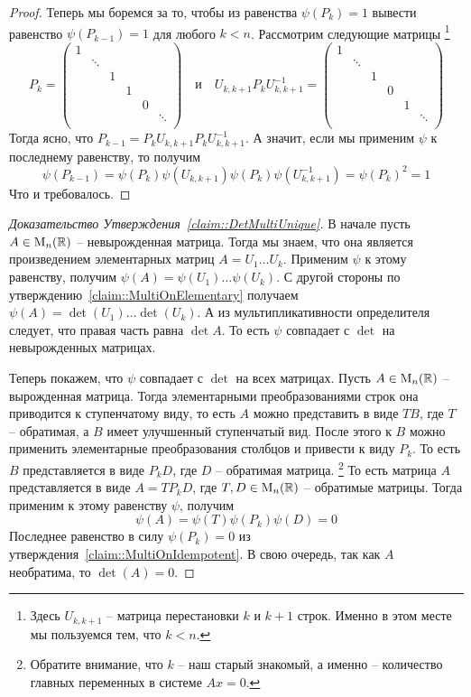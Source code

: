 \begin{proof}
Теперь мы боремся за то, чтобы из равенства $\psi(P_k) = 1$ вывести равенство $\psi(P_{k-1}) = 1$ для любого $k < n$.
Рассмотрим следующие матрицы%
\footnote{Здесь $U_{k, k+1}$ -- матрица перестановки $k$ и $k+1$ строк.
Именно в этом месте мы пользуемся тем, что $k<n$.}
\[
P_k=
\begin{pmatrix}
{1}&{}&{}&{}&{}&{}\\
{}&{\ddots}&{}&{}&{}&{}\\
{}&{}&{1}&{}&{}&{}\\
{}&{}&{}&{1}&{}&{}\\
{}&{}&{}&{}&{0}&{}\\
{}&{}&{}&{}&{}&{\ddots}\\
\end{pmatrix}
\quad\text{и}\quad
U_{k,k+1}P_kU_{k,k+1}^{-1}=
\begin{pmatrix}
{1}&{}&{}&{}&{}&{}\\
{}&{\ddots}&{}&{}&{}&{}\\
{}&{}&{1}&{}&{}&{}\\
{}&{}&{}&{0}&{}&{}\\
{}&{}&{}&{}&{1}&{}\\
{}&{}&{}&{}&{}&{\ddots}\\
\end{pmatrix}
\]
Тогда ясно, что $P_{k-1} = P_k U_{k,k+1}P_k U_{k,k+1}^{-1}$.
А значит, если мы применим $\psi$ к последнему равенству, то получим
\[
\psi(P_{k-1}) = \psi(P_k)\psi(U_{k,k+1})\psi(P_k)\psi(U_{k,k+1}^{-1}) = \psi(P_k)^2 = 1
\]
Что и требовалось.
\end{proof}


\begin{proof}
[Доказательство Утверждения~\ref{claim::DetMultiUnique}]
В начале пусть $A\in\operatorname{M}_{n}(\mathbb R)$ -- невырожденная матрица.
Тогда мы знаем, что она является произведением элементарных матриц $A = U_1\ldots U_k$.
Применим $\psi$ к этому равенству, получим $\psi(A) = \psi(U_1)\ldots \psi(U_k)$.
С другой стороны по утверждению~\ref{claim::MultiOnElementary} получаем $\psi(A) = \det(U_1)\ldots \det(U_k)$.
А из мультипликативности определителя следует, что правая часть равна $\det A$.
То есть $\psi$ совпадает с $\det$ на невырожденных матрицах.

Теперь покажем, что $\psi$ совпадает с $\det$ на всех матрицах.
Пусть $A\in\operatorname{M}_{n}(\mathbb R)$ -- вырожденная матрица.
Тогда элементарными преобразованиями строк она приводится к ступенчатому виду, то есть $A$ можно представить в виде $TB$, где $T$ -- обратимая, а $B$ имеет улучшенный ступенчатый вид.
После этого к $B$ можно применить элементарные преобразования столбцов и привести к виду $P_k$.
То есть $B$ представляется в виде $P_k D$, где $D$ -- обратимая матрица.%
\footnote{Обратите внимание, что $k$ -- наш старый знакомый, а именно -- количество главных переменных в системе $Ax = 0$.}
То есть матрица $A$ представляется в виде $A = T P_k D$, где $T,D\in\operatorname{M}_{n}(\mathbb R)$ -- обратимые матрицы.
Тогда применим к этому равенству $\psi$, получим
\[
\psi(A) = \psi(T)\psi(P_k)\psi(D) = 0
\]
Последнее равенство в силу $\psi(P_k) = 0$ из утверждения~\ref{claim::MultiOnIdempotent}.
В свою очередь, так как $A$ необратима, то $\det(A) = 0$.
\end{proof}

